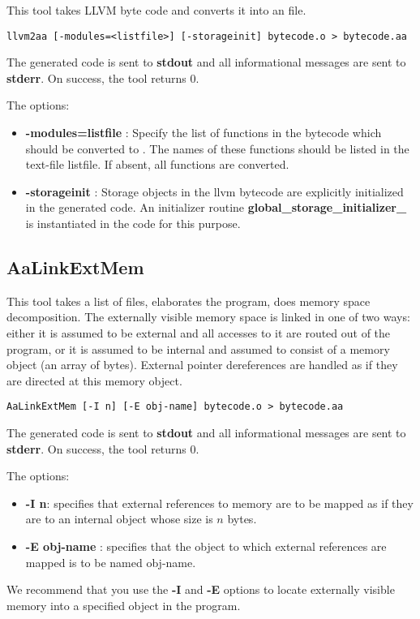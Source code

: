 This tool takes LLVM byte code and converts it into an
\Aa file.
\begin{verbatim}
llvm2aa [-modules=<listfile>] [-storageinit] bytecode.o > bytecode.aa
\end{verbatim}
The generated \Aa code is sent to {\bf stdout} and all informational
messages are sent to {\bf stderr}.  On success, the tool returns 0.

The options:
\begin{itemize}
\item {\bf -modules=listfile} : Specify the list of functions in the bytecode
which should be converted to \Aa.   The names of these functions should be
listed in the text-file listfile. If absent, all functions
are converted.
\item {\bf -storageinit} :  Storage objects in the llvm bytecode
are explicitly initialized in the generated \Aa code.   An initializer
routine {\bf global\_storage\_initializer\_} is instantiated in
the \Aa code for this purpose.
\end{itemize}

\subsection{{\bf AaLinkExtMem}}

This tool takes a list of \Aa files, elaborates the program,
does memory space decomposition.  The externally visible memory space is
linked in one of two ways: either it is assumed to be external
and all accesses to it are routed out of the \Aa program,
or it is assumed to be internal and assumed to consist of
a memory object (an array of bytes).  External pointer dereferences
are handled as if they are directed at this memory object.
\begin{verbatim}
AaLinkExtMem [-I n] [-E obj-name] bytecode.o > bytecode.aa
\end{verbatim}
The generated \Aa code is sent to {\bf stdout} and all informational
messages are sent to {\bf stderr}.  On success, the tool returns 0.

The options:
\begin{itemize}
\item {\bf -I n}: specifies that external references to memory
are to be mapped as if they are to an internal object whose size
is $n$ bytes.
\item {\bf -E obj-name} : specifies that the object to which
external references are mapped is to be named obj-name.
\end{itemize}
We recommend that you use the {\bf -I} and {\bf -E} options to
locate externally visible memory into a specified object in the
\Aa program.   

